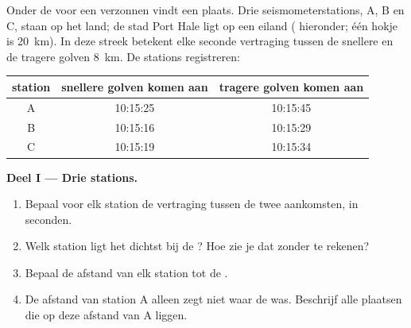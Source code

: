 \begin{problem}
\label{pb:g7:earthquakes:1}
Onder de  voor een verzonnen  vindt een  plaats. Drie
seismometerstations, A, B en C, staan op het land; de stad Port Hale ligt
op een eiland ( hieronder; één hokje is \qty{20}{km}). In deze streek
betekent elke seconde vertraging tussen de snellere en de tragere golven
\qty{8}{km}. De stations registreren:

\begin{center}
\small
\begin{tabular}{|c|c|c|}
\hline
\textbf{station} & \textbf{snellere golven komen aan} & \textbf{tragere golven komen aan} \\
\hline
A & 10:15:25 & 10:15:45 \\
B & 10:15:16 & 10:15:29 \\
C & 10:15:19 & 10:15:34 \\
\hline
\end{tabular}
\end{center}

\medskip
\noindent\textbf{Deel I --- Drie stations.}\par\nopagebreak
\begin{enumerate}[beginpenalty=10000]
  \item Bepaal voor elk station de vertraging tussen de twee aankomsten, in
        seconden.
  \item Welk station ligt het dichtst bij de ? Hoe zie je dat
        zonder te rekenen?
  \item Bepaal de afstand van elk station tot de .
  \item De afstand van station A alleen zegt niet waar de  was.
        Beschrijf alle plaatsen die op deze afstand van A liggen.
\end{enumerate}


\end{problem}
